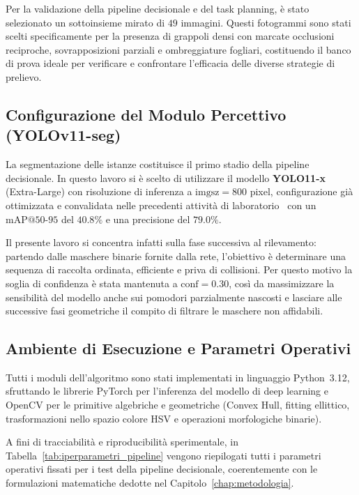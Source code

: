 Per la validazione della pipeline decisionale e del task planning, è stato 
selezionato un sottoinsieme mirato di $49$ immagini. Questi fotogrammi sono 
stati scelti specificamente per la presenza di grappoli densi con marcate 
occlusioni reciproche, sovrapposizioni parziali e ombreggiature fogliari, 
costituendo il banco di prova ideale per verificare e confrontare l'efficacia 
delle diverse strategie di prelievo.


\subsection{Configurazione del Modulo Percettivo (YOLOv11-seg)}
\label{subsec:modulo_percettivo}

La segmentazione delle istanze costituisce il primo stadio della pipeline decisionale. 
In questo lavoro si è scelto di utilizzare il modello \textbf{YOLO11-x} (Extra-Large) 
con risoluzione di inferenza a $\text{imgsz} = 800$ pixel, configurazione già ottimizzata 
e convalidata nelle precedenti attività di laboratorio~\cite{collega_yolo} con un 
$\text{mAP@50-95}$ del $40.8\%$ e una precisione del $79.0\%$.

Il presente lavoro si concentra infatti sulla fase successiva al rilevamento: partendo 
dalle maschere binarie fornite dalla rete, l'obiettivo è determinare una sequenza di 
raccolta ordinata, efficiente e priva di collisioni. Per questo motivo la soglia di 
confidenza è stata mantenuta a $\text{conf} = 0.30$, così da massimizzare la sensibilità 
del modello anche sui pomodori parzialmente nascosti e lasciare alle successive fasi 
geometriche il compito di filtrare le maschere non affidabili.

\subsection{Ambiente di Esecuzione e Parametri Operativi}
\label{subsec:parametri_operativi}

Tutti i moduli dell'algoritmo sono stati implementati in linguaggio Python~3.12, 
sfruttando le librerie PyTorch per l'inferenza del modello di deep learning e 
OpenCV per le primitive algebriche e geometriche (Convex Hull, fitting ellittico, 
trasformazioni nello spazio colore HSV e operazioni morfologiche binarie).

A fini di tracciabilità e riproducibilità sperimentale, in 
Tabella~\ref{tab:iperparametri_pipeline} vengono riepilogati tutti i parametri 
operativi fissati per i test della pipeline decisionale, coerentemente con le 
formulazioni matematiche dedotte nel Capitolo~\ref{chap:metodologia}.

